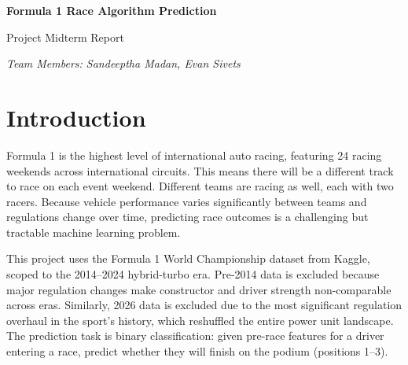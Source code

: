 \documentclass[11pt]{article}
\begin{document}
\begin{center}
{\Large \textbf{Formula 1 Race Algorithm Prediction}

\vspace{10pt}

Project Midterm Report}

\vspace{10pt}

\textit{Team Members: Sandeeptha Madan, Evan Sivets}
\end{center}




\begin{abstract}
Our task in this project is to predict whether a Formula 1 driver will finish on the podium (top 3) in a given race before it begins. Our motivation is a strong interest in the sport and in connecting machine learning theory to real-world structured data. We use data from the 2014--2024 hybrid-turbo era, engineering pre-race features such as grid position, qualifying result, and rolling driver and constructor performance statistics. We compare five models: Logistic Regression (L1 and L2), Support Vector Machine (linear and RBF kernels), and Decision Tree. Our best-performing model, SVM Linear, achieves a ROC-AUC of 0.946 on the 2022 validation set and 0.930 on the 2023--2024 test set.
\end{abstract}

\section{Introduction}

Formula 1 is the highest level of international auto racing, featuring 24 racing weekends across international circuits. This means there will be a different track to race on each event weekend. Different teams are racing as well, each with two racers. Because vehicle performance varies significantly between teams and regulations change over time, predicting race outcomes is a challenging but tractable machine learning problem.
 
This project uses the Formula 1 World Championship dataset from Kaggle, scoped to the 2014--2024 hybrid-turbo era. Pre-2014 data is excluded because major regulation changes make constructor and driver strength non-comparable across eras. Similarly, 2026 data is excluded due to the most significant regulation overhaul in the sport's history, which reshuffled the entire power unit landscape. The prediction task is binary classification: given pre-race features for a driver entering a race, predict whether they will finish on the podium (positions 1--3).
\end{document}
